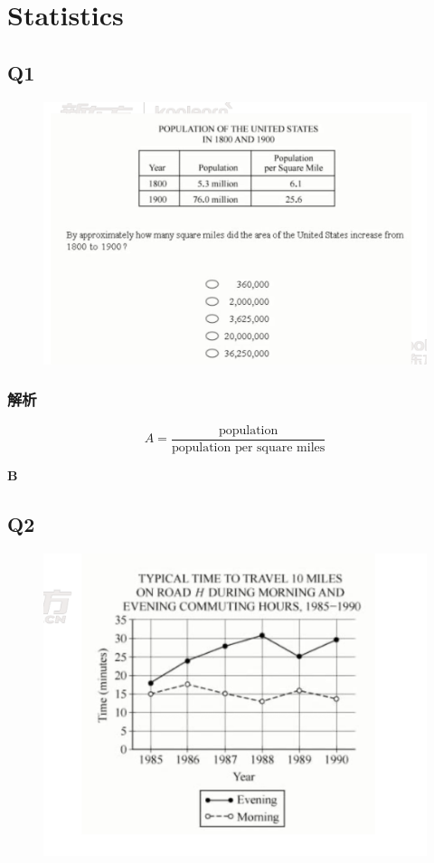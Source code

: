 \chapter{Statistics}

\section{Q1}

  \begin{figure}[H]
    \centering
    \includegraphics[width=0.7\columnwidth]{images/areas/stats/q1.png}
  \end{figure}

  \subsection{解析}

    \begin{equation*}
      A = \frac{\text{population}}{\text{population per square miles}}
    \end{equation*}

    \textbf{B}

\section{Q2}

  \begin{figure}[H]
    \centering
    \includegraphics[width=0.7\columnwidth]{images/areas/stats/q2.png}
  \end{figure}

